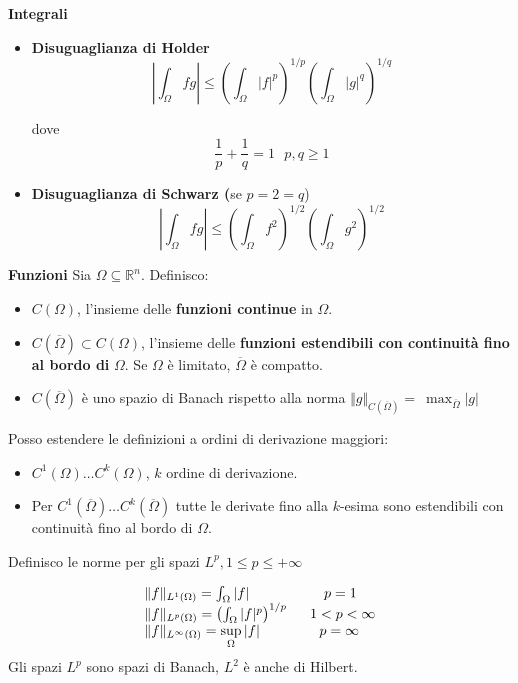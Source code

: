 \documentclass[10pt,a4paper,twoside,openright]{book}
\begin{document}
\textbf{Integrali}
\begin{itemize}
    \item \textbf{Disuguaglianza di Holder}
          \begin{equation*}
              \left| \int _{\Omega } fg\right| \leqslant \left(\int _{\Omega }| f| ^{p}\right)^{1/p}\left(\int _{\Omega }| g| ^{q}\right)^{1/q}
          \end{equation*}

          dove \begin{equation*}
              \frac{1}{p} +\frac{1}{q} =1\ \ \ p,q\geqslant 1
          \end{equation*}
    \item \textbf{Disuguaglianza di Schwarz (}se $p=2=q$) \begin{equation*}
              \left| \int _{\Omega } fg\right| \leqslant \left(\int _{\Omega } f^{2}\right)^{1/2}\left(\int _{\Omega } g^{2}\right)^{1/2}
          \end{equation*}
\end{itemize}

\textbf{Funzioni}
Sia $\Omega \subseteq \mathbb{R}^{n}$. Definisco:
\begin{itemize}
    \item $C(\Omega)$, l'insieme delle \textbf{funzioni continue} in $\Omega $.
    \item $C(\overline{\Omega }) \subset C(\Omega)$, l'insieme delle \textbf{funzioni estendibili con continuità fino al bordo di} $\Omega $. Se $\Omega $ è limitato, $\overline{\Omega }$ è compatto.
    \item $C(\overline{\Omega })$ è uno spazio di Banach rispetto alla norma $\Vert g\Vert _{C(\overline{\Omega })} =\ \max_{\overline{\Omega }}| g| $
\end{itemize}

Posso estendere le definizioni a ordini di derivazione maggiori:
\begin{itemize}
    \item $C^{1}(\Omega) \dotsc C^{k}(\Omega)$, $k$ ordine di derivazione.
    \item Per $C^{1}(\overline{\Omega }) \dotsc C^{k}(\overline{\Omega })$ tutte le derivate fino alla $k$-esima sono estendibili con continuità fino al bordo di $\displaystyle \Omega $.
\end{itemize}

Definisco le norme per gli spazi $L^{p},1\leqslant p\leqslant +\infty $

\begin{equation*}
    \begin{array}{ l l }
        \Vert f\Vert _{L^{1}(\Omega)} =\int _{\Omega }| f|                            & \ \ \ \ p=1    \\
        \Vert f\Vert _{L^{p}(\Omega)} =\left(\int _{\Omega }| f| ^{p}\right)^{1/p} \  & \ 1< p< \infty \\
        \Vert f\Vert _{L^{\infty }(\Omega)} =\sup\limits _{\Omega }| f|               & \ \ \ p=\infty
    \end{array}
\end{equation*}
Gli spazi $\displaystyle L^{p}$ sono spazi di Banach, $\displaystyle L^{2}$ è anche di Hilbert.
\end{document}
